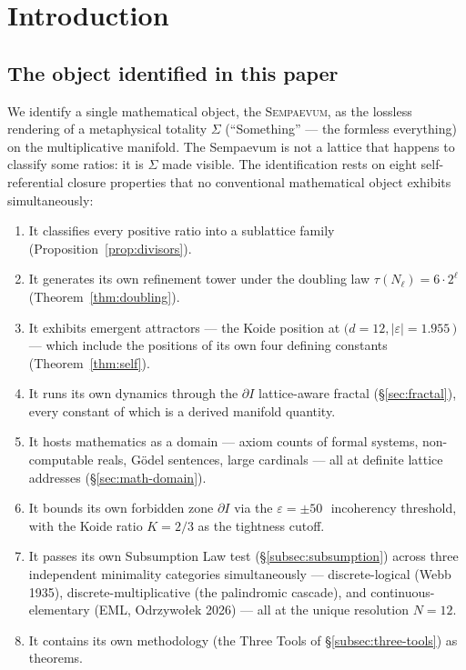 \documentclass[11pt,a4paper]{article}
\theoremstyle{definition}
\theoremstyle{remark}
\newcommand{\Sempaevum}{\textsc{Sempaevum}}
\begin{document}
\tableofcontents

\section{Introduction}

\subsection{The object identified in this paper}

We identify a single mathematical object, the \Sempaevum, as the lossless rendering of a metaphysical totality $\Sigma$ (``Something'' --- the formless everything) on the multiplicative manifold. The Sempaevum is not a lattice that happens to classify some ratios: it is $\Sigma$ made visible. The identification rests on eight self-referential closure properties that no conventional mathematical object exhibits simultaneously:

\begin{enumerate}[leftmargin=*]
\item It classifies every positive ratio into a sublattice family (Proposition~\ref{prop:divisors}).
\item It generates its own refinement tower under the doubling law $\tau(N_{\ell}) = 6\cdot 2^{\ell}$ (Theorem~\ref{thm:doubling}).
\item It exhibits emergent attractors --- the Koide position at $(d=12, |\varepsilon|=1.955$\,\textcent $)$ --- which include the positions of its own four defining constants (Theorem~\ref{thm:self}).
\item It runs its own dynamics through the $\partial I$ lattice-aware fractal (\S\ref{sec:fractal}), every constant of which is a derived manifold quantity.
\item It hosts mathematics as a domain --- axiom counts of formal systems, non-computable reals, G\"odel sentences, large cardinals --- all at definite lattice addresses (\S\ref{sec:math-domain}).
\item It bounds its own forbidden zone $\partial I$ via the $\varepsilon=\pm 50$\,\textcent\ incoherency threshold, with the Koide ratio $K=2/3$ as the tightness cutoff.
\item It passes its own Subsumption Law test (\S\ref{subsec:subsumption}) across three independent minimality categories simultaneously --- discrete-logical (Webb 1935), discrete-multiplicative (the palindromic cascade), and continuous-elementary (EML, Odrzywo{\l}ek 2026) --- all at the unique resolution $N=12$.
\item It contains its own methodology (the Three Tools of \S\ref{subsec:three-tools}) as theorems.
\end{enumerate}
\end{document}
